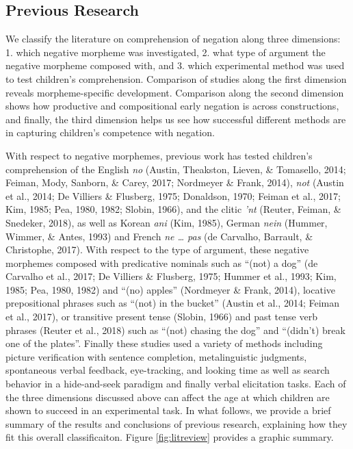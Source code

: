 \documentclass[man,floatsintext]{apa6}
\begin{document}
\hypertarget{previous-research}{%
\subsection{Previous Research}\label{previous-research}}

We classify the literature on comprehension of negation along three dimensions: 1. which negative morpheme was investigated, 2. what type of argument the negative morpheme composed with, and 3. which experimental method was used to test children's comprehension. Comparison of studies along the first dimension reveals morpheme-specific development. Comparison along the second dimension shows how productive and compositional early negation is across constructions, and finally, the third dimension helps us see how successful different methods are in capturing children's competence with negation.

With respect to negative morphemes, previous work has tested children's comprehension of the English \emph{no} (Austin, Theakston, Lieven, \& Tomasello, 2014; Feiman, Mody, Sanborn, \& Carey, 2017; Nordmeyer \& Frank, 2014), \emph{not} (Austin et al., 2014; De Villiers \& Flusberg, 1975; Donaldson, 1970; Feiman et al., 2017; Kim, 1985; Pea, 1980, 1982; Slobin, 1966), and the clitic \emph{'nt} (Reuter, Feiman, \& Snedeker, 2018), as well as Korean \emph{ani} (Kim, 1985), German \emph{nein} (Hummer, Wimmer, \& Antes, 1993) and French \emph{ne \ldots{} pas} (de Carvalho, Barrault, \& Christophe, 2017). With respect to the type of argument, these negative morphemes composed with predicative nominals such as \enquote{(not) a dog} (de Carvalho et al., 2017; De Villiers \& Flusberg, 1975; Hummer et al., 1993; Kim, 1985; Pea, 1980, 1982) and \enquote{(no) apples} (Nordmeyer \& Frank, 2014), locative prepositional phrases such as \enquote{(not) in the bucket} (Austin et al., 2014; Feiman et al., 2017), or transitive present tense (Slobin, 1966) and past tense verb phrases (Reuter et al., 2018) such as \enquote{(not) chasing the dog} and \enquote{(didn't) break one of the plates}. Finally these studies used a variety of methods including picture verification with sentence completion, metalinguistic judgments, spontaneous verbal feedback, eye-tracking, and looking time as well as search behavior in a hide-and-seek paradigm and finally verbal elicitation tasks. Each of the three dimensions discussed above can affect the age at which children are shown to succeed in an experimental task. In what follows, we provide a brief summary of the results and conclusions of previous research, explaining how they fit this overall classificaiton. Figure \ref{fig:litreview} provides a graphic summary.
\end{document}
